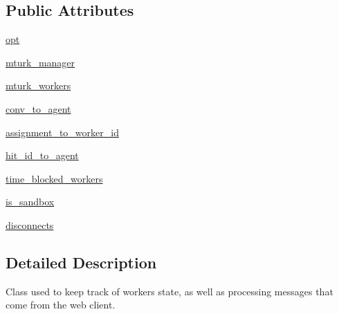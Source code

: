\subsection*{Public Attributes}
\begin{DoxyCompactItemize}
\item 
\hyperlink{classparlai_1_1mturk_1_1core_1_1legacy__2018_1_1worker__manager_1_1WorkerManager_a5ded59b0eaf47582110862cc1b8b379e}{opt}
\item 
\hyperlink{classparlai_1_1mturk_1_1core_1_1legacy__2018_1_1worker__manager_1_1WorkerManager_a12d2994adc934a5e06f73c89db795b31}{mturk\+\_\+manager}
\item 
\hyperlink{classparlai_1_1mturk_1_1core_1_1legacy__2018_1_1worker__manager_1_1WorkerManager_a6cb32a6cb5daeecb553a8514ea4e4617}{mturk\+\_\+workers}
\item 
\hyperlink{classparlai_1_1mturk_1_1core_1_1legacy__2018_1_1worker__manager_1_1WorkerManager_aba0415d2901a20387861d02da72b5893}{conv\+\_\+to\+\_\+agent}
\item 
\hyperlink{classparlai_1_1mturk_1_1core_1_1legacy__2018_1_1worker__manager_1_1WorkerManager_aed0adcac2d4346a8547c3a536fd0af25}{assignment\+\_\+to\+\_\+worker\+\_\+id}
\item 
\hyperlink{classparlai_1_1mturk_1_1core_1_1legacy__2018_1_1worker__manager_1_1WorkerManager_aa180307b749db9ce504b0a510847a6c5}{hit\+\_\+id\+\_\+to\+\_\+agent}
\item 
\hyperlink{classparlai_1_1mturk_1_1core_1_1legacy__2018_1_1worker__manager_1_1WorkerManager_a0bb97581f917b4dddca801e68fa5dfb3}{time\+\_\+blocked\+\_\+workers}
\item 
\hyperlink{classparlai_1_1mturk_1_1core_1_1legacy__2018_1_1worker__manager_1_1WorkerManager_a63765df2448a589f07525292d44489a7}{is\+\_\+sandbox}
\item 
\hyperlink{classparlai_1_1mturk_1_1core_1_1legacy__2018_1_1worker__manager_1_1WorkerManager_a69101bd8ac735ee1c42a1778eeb8e812}{disconnects}
\end{DoxyCompactItemize}


\subsection{Detailed Description}
\begin{DoxyVerb}Class used to keep track of workers state, as well as processing messages that come
from the web client.
\end{DoxyVerb}
 

